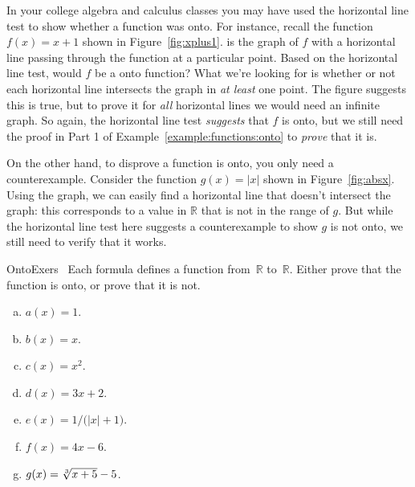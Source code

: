 % 

\begin{rem}
In your college algebra and calculus classes you may have used the horizontal line test to show whether a function was onto.  
For instance, recall the function $f(x)=x +1$ shown in Figure~\ref{fig:xplus1}. is the graph of $f$ with a horizontal line passing through the function at a particular point.
Based on the horizontal line test, would $f$ be a onto function? What we're looking for is whether or not each horizontal line intersects the graph in \emph{at least} one point. The figure suggests this is true, but to prove it for \emph{all} horizontal lines we would need an infinite graph.  So again, the horizontal line test \emph{suggests} that $f$ is onto, but we still need the proof in Part 1 of Example~\ref{example:functions:onto} to \emph{prove} that it is.

On the other hand, to disprove a function is onto, you only need a counterexample.  Consider the function $g(x)= |x|$ shown in Figure~\ref{fig:absx}. Using the graph, we can easily find a horizontal line that doesn't intersect the graph: this corresponds to a value in $\mathbb{R}$ that is not in the range of $g$.  But while the horizontal line test here suggests a counterexample to show $g$ is not onto, we still need to verify that it works.
\end{rem}    

  
\begin{exercise}{OntoExers} \ 
Each formula defines a function from~$\mathbb{R}$ to~$\mathbb{R}$. Either prove that the function is onto, or prove that it is not.
\begin{multicols}{2}
\begin{enumerate}[(a)]
\item \label{OntoExers-formula-a(x)}
 $a(x) = 1$.
\item \label{OntoExers-formula-b(x)}
 $b(x) = x$.
\item \label{OntoExers-formula-c(x)}
 $c(x) = x^2$.
\item \label{OntoExers-formula-d(x)}
 $d(x) = 3x + 2$.
\item \label{OntoExers-formula-e(x)}
 $e(x) = 1/ \bigl( |x| + 1 \bigr)$.
\item \label{OntoExers-formula-f(x)}
 $f(x) = 4x - 6$.
\item \label{OntoExers-formula-g(x)}
 $g(x) = \root 3 \of {x+5} - 5$.
\end{enumerate}
\end{multicols}
\end{exercise}

